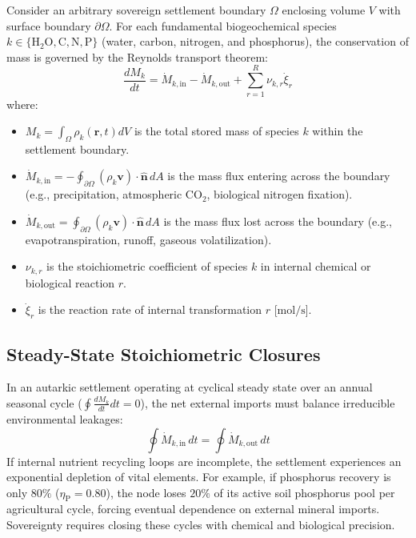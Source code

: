 Consider an arbitrary sovereign settlement boundary $\Omega$ enclosing volume $V$ with surface boundary $\partial \Omega$. For each fundamental biogeochemical species $k \in \{\mathrm{H_2O, C, N, P}\}$ (water, carbon, nitrogen, and phosphorus), the conservation of mass is governed by the Reynolds transport theorem:
\begin{equation}
\frac{d M_k}{dt} = \dot{M}_{k,\mathrm{in}} - \dot{M}_{k,\mathrm{out}} + \sum_{r=1}^{R} \nu_{k,r} \dot{\xi}_r
\label{eq:mass_conservation_general}
\end{equation}
where:
\begin{itemize}
    \item $M_k = \int_{\Omega} \rho_k(\mathbf{r}, t) dV$ is the total stored mass of species $k$ within the settlement boundary.
    \item $\dot{M}_{k,\mathrm{in}} = -\oint_{\partial \Omega} (\rho_k \mathbf{v}) \cdot \hat{\mathbf{n}} \, dA$ is the mass flux entering across the boundary (e.g., precipitation, atmospheric $\mathrm{CO}_2$, biological nitrogen fixation).
    \item $\dot{M}_{k,\mathrm{out}} = \oint_{\partial \Omega} (\rho_k \mathbf{v}) \cdot \hat{\mathbf{n}} \, dA$ is the mass flux lost across the boundary (e.g., evapotranspiration, runoff, gaseous volatilization).
    \item $\nu_{k,r}$ is the stoichiometric coefficient of species $k$ in internal chemical or biological reaction $r$.
    \item $\dot{\xi}_r$ is the reaction rate of internal transformation $r$ [$\mathrm{mol/s}$].
\end{itemize}

\subsection{Steady-State Stoichiometric Closures}

In an autarkic settlement operating at cyclical steady state over an annual seasonal cycle ($\oint \frac{d M_k}{dt} dt = 0$), the net external imports must balance irreducible environmental leakages:
\begin{equation}
\oint \dot{M}_{k,\mathrm{in}} \, dt = \oint \dot{M}_{k,\mathrm{out}} \, dt
\label{eq:steady_state_closure}
\end{equation}
If internal nutrient recycling loops are incomplete, the settlement experiences an exponential depletion of vital elements. For example, if phosphorus recovery is only $80\%$ ($\eta_{\mathrm{P}} = 0.80$), the node loses $20\%$ of its active soil phosphorus pool per agricultural cycle, forcing eventual dependence on external mineral imports. Sovereignty requires closing these cycles with chemical and biological precision.

